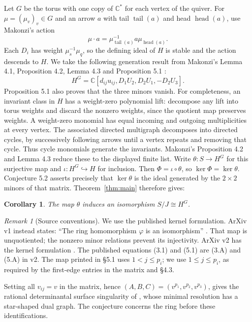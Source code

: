 \documentclass[11pt]{article}
\newtheorem{corollary}[theorem]{Corollary}
\theoremstyle{remark}
\newtheorem{remark}[theorem]{Remark}
\newcommand{\CC}{\mathbb C}
\begin{document}
Let $G$ be the torus with one copy of $\CC^*$ for each vertex of the
quiver. For $\mu=(\mu_v)_v\in G$ and an arrow $a$ with tail $\operatorname{tail}(a)$ and
head $\operatorname{head}(a)$, use Makonzi's action
\[
 \mu\cdot a=\mu_{\operatorname{tail}(a)}^{-1}a\mu_{\operatorname{head}(a)}.
\]
Each $D_i$ has weight $\mu_s^{-1}\mu_q$, so the defining ideal of $H$
is stable and the action descends to $H$.
We take the following generation result from Makonzi's Lemma 4.1,
Proposition 4.2, Lemma 4.3 and Proposition 5.1 \cite{Makonzi}:
\[
 H^G=\CC[d_{ij}u_{ij},D_1U_2,D_2U_1,-D_2U_3].
\]
Proposition 5.1 also proves that the three minors vanish.
For completeness, an invariant class in $H$ has a weight-zero polynomial
lift: decompose any lift into torus weights and discard the nonzero
weights, since the quotient map preserves weights. A weight-zero monomial
has equal incoming and outgoing multiplicities at every vertex. The
associated directed multigraph decomposes into directed cycles, by
successively following arrows until a vertex repeats and removing that
cycle. Thus cycle monomials generate the invariants. Makonzi's
Proposition 4.2 and Lemma 4.3 reduce these to the displayed finite list.
Write $\theta:S\to H^G$ for this surjective map and
$\iota:H^G\hookrightarrow H$ for inclusion. Then $\Phi=\iota\circ\theta$,
so $\ker\Phi=\ker\theta$.
Conjecture 5.2 asserts precisely that $\ker\theta$ is the ideal generated
by the $2\times2$ minors of that matrix. Theorem~\ref{thm:main} therefore gives:
\begin{corollary}\label{cor:invariants}
The map $\theta$ induces an isomorphism $S/J\cong H^G$.
\end{corollary}

\begin{remark}[Source conventions]\label{rem:versions}
We use the published kernel formulation. ArXiv v1 instead states:
``The ring homomorphism $\varphi$ is an isomorphism''
\cite[Conjecture 5.2]{MakonziV1}.
That map is unquotiented; the nonzero minor relations prevent its injectivity. ArXiv v2 has the kernel
formulation \cite{MakonziV2}. The published equations
(3.1) and (5.1) are (3.A) and (5.A) in v2. The map printed in \S5.1
uses $1<j\le p_i$; we use $1\le j\le p_i$, as required by the
first-edge entries in the matrix and \S4.3.
\end{remark}

Setting all $v_{ij}=v$ in the matrix, hence
$(A,B,C)=(v^{p_1},v^{p_2},v^{p_3})$, gives the rational determinantal
surface singularity of \cite[\S1.2]{Makonzi}, whose minimal resolution has a
star-shaped dual graph. The conjecture concerns the ring before these identifications.
\end{document}
